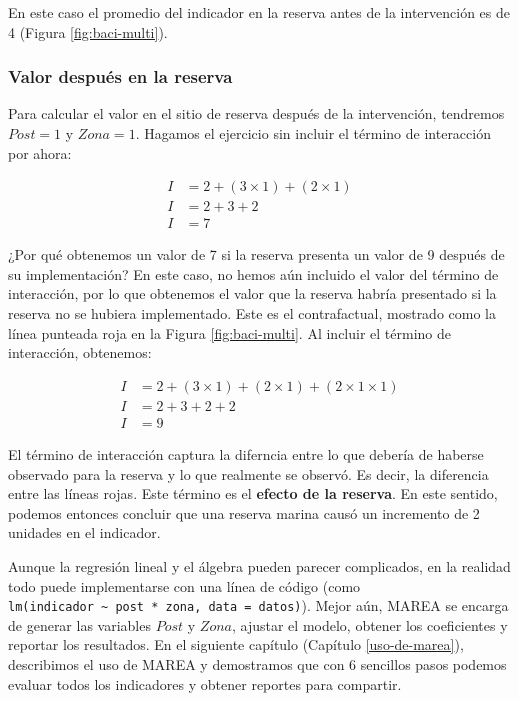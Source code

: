 \documentclass[]{krantz}
\begin{document}
En este caso el promedio del indicador en la reserva antes de la
intervención es de 4 (Figura \ref{fig:baci-multi}).

\hypertarget{valor-despues-en-la-reserva}{%
\subsubsection{Valor después en la
reserva}\label{valor-despues-en-la-reserva}}

Para calcular el valor en el sitio de reserva después de la
intervención, tendremos \(Post = 1\) y \(Zona =1\). Hagamos el ejercicio
sin incluir el término de interacción por ahora:

\[
\begin{split}
I &= 2 + (3 \times 1) + (2\times 1) \\
I &= 2 + 3 + 2 \\
I &= 7
\end{split}
\]

¿Por qué obtenemos un valor de 7 si la reserva presenta un valor de 9
después de su implementación? En este caso, no hemos aún incluido el
valor del término de interacción, por lo que obtenemos el valor que la
reserva habría presentado si la reserva no se hubiera implementado. Este
es el contrafactual, mostrado como la línea punteada roja en la Figura
\ref{fig:baci-multi}. Al incluir el término de interacción, obtenemos:

\[
\begin{split}
I &= 2 + (3 \times 1) + (2\times 1) + (2\times 1 \times 1)\\
I &= 2 + 3 + 2 + 2\\
I &= 9
\end{split}
\]

El término de interacción captura la diferncia entre lo que debería de
haberse observado para la reserva y lo que realmente se observó. Es
decir, la diferencia entre las líneas rojas. Este término es el
\textbf{efecto de la reserva}. En este sentido, podemos entonces
concluir que una reserva marina causó un incremento de 2 unidades en el
indicador.

Aunque la regresión lineal y el álgebra pueden parecer complicados, en
la realidad todo puede implementarse con una línea de código (como
\texttt{lm(indicador\ \textasciitilde{}\ post\ *\ zona,\ data\ =\ datos)}).
Mejor aún, MAREA se encarga de generar las variables \(Post\) y
\(Zona\), ajustar el modelo, obtener los coeficientes y reportar los
resultados. En el siguiente capítulo (Capítulo \ref{uso-de-marea}),
describimos el uso de MAREA y demostramos que con 6 sencillos pasos
podemos evaluar todos los indicadores y obtener reportes para compartir.
\end{document}
